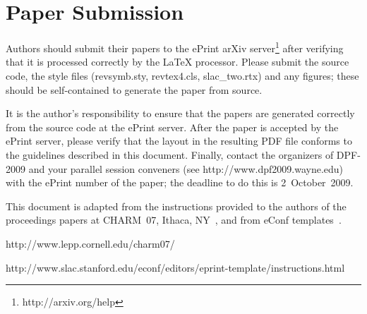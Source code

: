 \section{Paper Submission}

Authors should submit their papers to the ePrint arXiv 
server\footnote{http://arxiv.org/help} 
after verifying that it is processed correctly by the LaTeX processor.
Please submit the source code, the style files 
(revsymb.sty, revtex4.cls, slac\_two.rtx) 
and any figures; 
these should be self-contained to generate the paper from source.  

It is the author's responsibility to ensure that the papers are 
generated correctly from the source code at the ePrint server. 
After the paper is accepted by the ePrint server, please verify that
the layout in the resulting  PDF file conforms to the guidelines 
described in this document.
Finally, contact the organizers of DPF-2009 and your parallel session conveners 
(see http://www.dpf2009.wayne.edu) with the ePrint number of the paper; 
the deadline to do this is 2~October~2009.

\begin{acknowledgments}
This document is adapted from the instructions provided to the authors
of the proceedings papers at CHARM~07, Ithaca, NY~\cite{charm07},  
and from eConf templates~\cite{templates-ref}.
\end{acknowledgments}

\bigskip %
%
\begin{thebibliography}{9}   %

   http://www.lepp.cornell.edu/charm07/

 http://www.slac.stanford.edu/econf/editors/eprint-template/instructions.html

\end{thebibliography}




